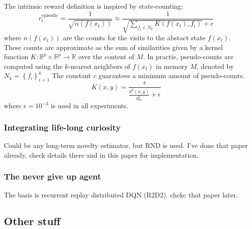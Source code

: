 \documentclass{article}
\begin{document}
The intrinsic reward definition is inspired by state-counting:
\begin{equation}
		r_{ t }^{ \text{episodic} } = \frac{1}{\sqrt{n (f (x_{ t }))}} \approx
		\frac{1}{\sqrt{\sum_{f_{ i } \in N_{ k }}^{} K (f (x_{ t }), f_{ i })} + c} 
\end{equation}
where $ n ( f (x_{ t }))  $ are the counts for the visits to the abstact state $ f (x_{ t })  $.
These counts are approximate as the sum of similarities given by a kernel function 
$ K : \mathbb{R}^{ p } \times \mathbb{R}^{ p } \to \mathbb{R}  $ over the content of $M $.
In practie, pseudo-counts are computed using the $ k  $-nearest neighbors of $ f (x_{ t })  $
in memory $ M  $, denoted by $ N_{ k } = \left\{ f_{ i }\right\}^{ k }_{ i=1 }   $
The constant $ c  $ guarantees a minimum amount of pseudo-counts.
\begin{equation}
		K (x,y) = \frac{\epsilon}{\frac{d^{ 2 } (x,y)}{d^{ 2 }_{ m }} + \epsilon} 
\end{equation}
where $ \epsilon=10^{ -3 }  $ is used in all experiments.

\subsubsection{Integrating life-long curiosity}
Could be any long-term novelty estimator, but RND is used.
I've done that paper already, check details there and in this paper
for implementation.

\subsubsection{The never give up agent}
The basis is recurrent replay distributed DQN (R2D2).
chekc that paper later.






\subsection{Other stuff}
\end{document}
